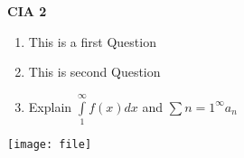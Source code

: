 \documentclass[10pt, a4paper]{article}
\begin{document}
\textbf{CIA 2}
\def\eq{y=\dfrac{x}{3x^2+x+1}}
\begin{enumerate}
    \item This is a first Question
    \item This is second Question
    \item Explain $\int\limits_{1}^{\infty}f(x)dx$ and $\sum\limits{n=1}^{\infty} a_n$
\end{enumerate}
\begin{center}
    \texttt{[image: file]}
\end{center}
\end{document}
